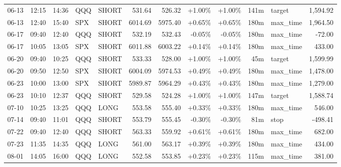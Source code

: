 \documentclass[11pt,a4paper,twoside]{article}
\begin{document}
\begin{center}
\begin{longtable}{>{\color{txtmain}}l l l l l r r r r r >{\color{txtmain}}l r}
06-13 & 12:15 & 14:36 & QQQ & SHORT & 531.64 & 526.32 & \textcolor{wingreen}{+1.00\%} & \textcolor{wingreen}{+1.00\%} & 141m & target & \textcolor{wingreen}{1,594.92} \\
06-13 & 12:40 & 15:40 & SPX & SHORT & 6014.69 & 5975.40 & \textcolor{wingreen}{+0.65\%} & \textcolor{wingreen}{+0.65\%} & 180m & max\_time & \textcolor{wingreen}{1,964.50} \\
06-17 & 09:40 & 12:40 & QQQ & SHORT & 532.19 & 532.43 & \textcolor{lossred}{-0.05\%} & \textcolor{lossred}{-0.05\%} & 180m & max\_time & \textcolor{lossred}{-72.00} \\
06-17 & 10:05 & 13:05 & SPX & SHORT & 6011.88 & 6003.22 & \textcolor{wingreen}{+0.14\%} & \textcolor{wingreen}{+0.14\%} & 180m & max\_time & \textcolor{wingreen}{433.00} \\
06-20 & 09:40 & 10:25 & QQQ & SHORT & 533.33 & 528.00 & \textcolor{wingreen}{+1.00\%} & \textcolor{wingreen}{+1.00\%} & 45m & target & \textcolor{wingreen}{1,599.99} \\
06-20 & 09:50 & 12:50 & SPX & SHORT & 6004.09 & 5974.53 & \textcolor{wingreen}{+0.49\%} & \textcolor{wingreen}{+0.49\%} & 180m & max\_time & \textcolor{wingreen}{1,478.00} \\
06-23 & 10:00 & 13:00 & SPX & SHORT & 5989.87 & 5964.29 & \textcolor{wingreen}{+0.43\%} & \textcolor{wingreen}{+0.43\%} & 180m & max\_time & \textcolor{wingreen}{1,279.00} \\
06-23 & 10:10 & 12:37 & QQQ & SHORT & 529.58 & 524.28 & \textcolor{wingreen}{+1.00\%} & \textcolor{wingreen}{+1.00\%} & 147m & target & \textcolor{wingreen}{1,588.74} \\
07-10 & 10:25 & 13:25 & QQQ & LONG & 553.58 & 555.40 & \textcolor{wingreen}{+0.33\%} & \textcolor{wingreen}{+0.33\%} & 180m & max\_time & \textcolor{wingreen}{546.00} \\
07-14 & 09:40 & 11:01 & QQQ & SHORT & 553.79 & 555.45 & \textcolor{lossred}{-0.30\%} & \textcolor{lossred}{-0.30\%} & 81m & stop & \textcolor{lossred}{-498.41} \\
07-22 & 09:40 & 12:40 & QQQ & SHORT & 563.33 & 559.92 & \textcolor{wingreen}{+0.61\%} & \textcolor{wingreen}{+0.61\%} & 180m & max\_time & \textcolor{wingreen}{682.00} \\
07-23 & 11:35 & 14:35 & QQQ & LONG & 561.00 & 563.17 & \textcolor{wingreen}{+0.39\%} & \textcolor{wingreen}{+0.39\%} & 180m & max\_time & \textcolor{wingreen}{434.00} \\
08-01 & 14:05 & 16:00 & QQQ & LONG & 552.58 & 553.85 & \textcolor{wingreen}{+0.23\%} & \textcolor{wingreen}{+0.23\%} & 115m & max\_time & \textcolor{wingreen}{381.00} \\

\end{longtable}
\end{center}
\end{document}
